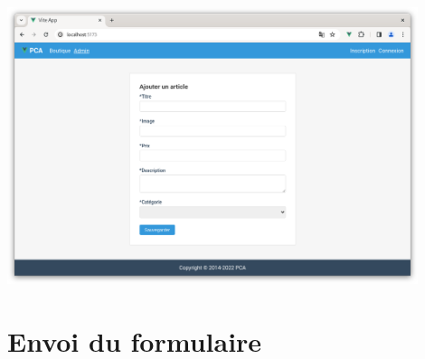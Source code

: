 \begin{center}
\includegraphics[width=12cm]{images/image35.png}
\end{center}


\section{Envoi du formulaire}
